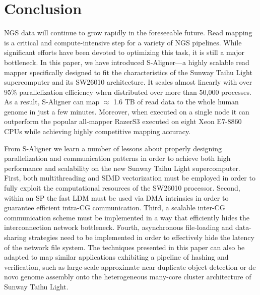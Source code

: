 \section{Conclusion}
\label{Conclusion}

NGS data will continue to grow rapidly in the foreseeable future. Read
mapping is a critical and compute-intensive step for a variety of NGS
pipelines. While significant efforts have been devoted to optimizing
this task, it is still a major bottleneck. In this paper, we have
introduced S-Aligner---a highly scalable read mapper specifically
designed to fit the characteristics of the Sunway Taihu Light
supercomputer and its SW26010 architecture.  It scales almost linearly
with over 95\% parallelization efficiency when distributed over more
than 50,000 processes. As a result, S-Aligner can map $\approx$ 1.6 TB
of read data to the whole human genome in just a few
minutes. Moreover, when executed on a single node it can outperform
the popular all-mapper RazerS3 executed on eight Xeon E7-8860 CPUs
while achieving highly competitive mapping accuracy.

From S-Aligner we learn a number of lessons about properly
designing parallelization and communication patterns in order to
achieve both high performance and scalability on the new Sunway Taihu
Light supercomputer. First, both multithreading and SIMD vectorization
must be employed in order to fully exploit the computational resources of
the SW26010 processor. Second, within an SP the fast LDM must be used
via DMA intrinsics in order to guarantee efficient intra-CG
communication. Third, a scalable inter-CG communication scheme must be
implemented in a way that efficiently hides the interconnection
network bottleneck. Fourth, asynchronous file-loading and data-sharing
strategies need to be implemented in order to effectively hide the
latency of the network file system. The techniques presented in this
paper can also be adapted to map similar applications exhibiting a
pipeline of hashing and verification, such as large-scale approximate
near duplicate object detection \cite{efficient} or de novo genome
assembly \cite{swap} onto the heterogeneous many-core cluster
architecture of Sunway Taihu Light.
